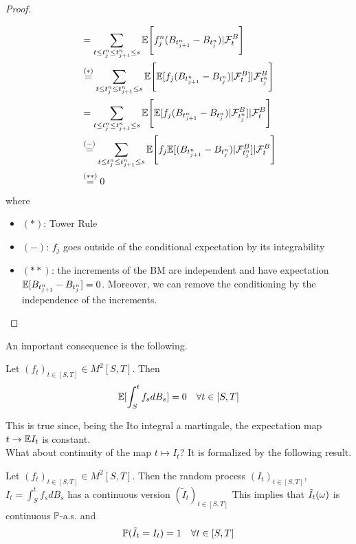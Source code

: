 \begin{proof}
\begin{itemize}
\begin{align*}
            &= \sum_{t \leq t_j^n \leq t_{j+1}^n \leq s} \mathbb{E}\Bigg[f_j^n (B_{t_{j+1}^n} - B_{t_j^n}) | \mathcal{F}_t^B\Bigg]\\
            &\stackrel{(*)}= \sum_{t \leq t_j^n \leq t_{j+1}^n \leq s} \mathbb{E}\Bigg[\mathbb{E}[f_j(B_{t_{j+1}^n}- B_{t_j^n})|\mathcal{F}_{t}^B]|\mathcal{F}_{t_j^n}^B\Bigg]\\
            &= \sum_{t \leq t_j^n \leq t_{j+1}^n \leq s} \mathbb{E}\Bigg[\mathbb{E}[f_j(B_{t_{j+1}^n}- B_{t_j^n})|\mathcal{F}_{t_j^n}^B]|\mathcal{F}_{t}^B\Bigg]\\
            &\stackrel{(-)}= \sum_{t \leq t_j^n \leq t_{j+1}^n \leq s} \mathbb{E}\Bigg[f_j\mathbb{E}[(B_{t_{j+1}^n}- B_{t_j^n})|\mathcal{F}_{t_j^n}^B]|\mathcal{F}_{t}^B\Bigg]\\
            &\stackrel{(**)}= 0
        \end{align*}
        where 
        \begin{itemize}
            \item $(*)$: Tower Rule
            \item $(-)$: $f_j$ goes outside of the conditional expectation by its integrability 
            \item $(**)$: the increments of the BM are independent and have expectation $\mathbb{E}[B_{t_{j+1}^n}- B_{t_j^n}] = 0$. Moreover, we can remove the conditioning by the independence of the increments.
        \end{itemize}
    \end{itemize}
\end{proof}
An important consequence is the following.
\begin{PropBox}
    \begin{Cor}
        Let $(f_t)_{t \in [S,T]}\in M^2[S,T]$. Then 
        \begin{equation*}
            \mathbb{E}[\int_S^t f_s dB_s]=0 \quad \forall t \in [S,T]
        \end{equation*}
    \end{Cor}
\end{PropBox}
This is true since, being the Ito integral a martingale, the expectation map $t \rightarrow \mathbb{E} I_t$ is constant. 
\\

What about continuity of the map $t \mapsto I_t$? It is formalized by the following result. 
\begin{ThBox}
    \begin{Th}
    Let $(f_t)_{t \in [S,T]}\in M^2 [S,T]$. Then the random process $(I_t)_{t \in [S,T]}$, $I_t = \int_S^t f_s dB_s$ has a continuous version $(\tilde{I}_t)_{t \in [S,T]}$
    This implies that $\Tilde{I}_t(\omega)$ is continuous $\mathbb{P}$-a.s. and
    \begin{equation*}
        \mathbb{P}(\Tilde{I}_t = I_t) = 1 \quad \forall t \in [S,T]
    \end{equation*}
\end{Th}
\end{ThBox}

